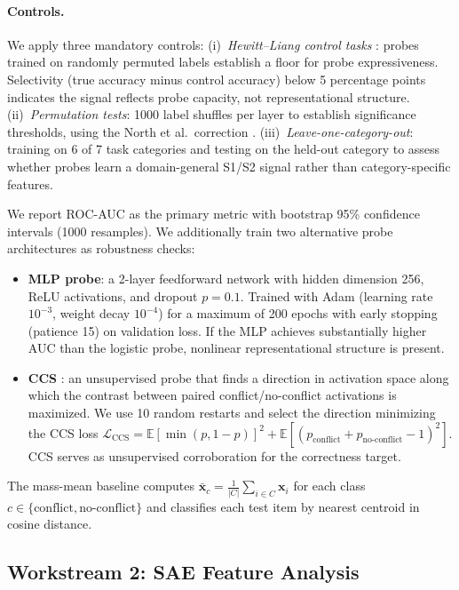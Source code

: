 \paragraph{Controls.}  We apply three mandatory controls:
(i)~\emph{Hewitt--Liang control tasks} \citep{hewitt2019control}: probes
trained on randomly permuted labels establish a floor for probe
expressiveness.  Selectivity (true accuracy minus control accuracy) below
5 percentage points indicates the signal reflects probe capacity, not
representational structure.
(ii)~\emph{Permutation tests}: 1000 label shuffles per layer to establish
significance thresholds, using the North et al.\ correction
\citep{north2002note}.
(iii)~\emph{Leave-one-category-out}: training on 6 of 7 task categories and
testing on the held-out category to assess whether probes learn a
domain-general S1/S2 signal rather than category-specific features.

We report ROC-AUC as the primary metric with bootstrap 95\% confidence
intervals (1000 resamples).  We additionally train two alternative probe
architectures as robustness checks:

\begin{itemize}[leftmargin=*,itemsep=1pt]
  \item \textbf{MLP probe}: a 2-layer feedforward network with hidden
  dimension 256, ReLU activations, and dropout $p = 0.1$.  Trained with
  Adam (learning rate $10^{-3}$, weight decay $10^{-4}$) for a maximum of
  200 epochs with early stopping (patience 15) on validation loss.  If the
  MLP achieves substantially higher AUC than the logistic probe, nonlinear
  representational structure is present.
  \item \textbf{CCS} \citep{burns2022discovering}: an unsupervised probe
  that finds a direction in activation space along which the contrast
  between paired conflict/no-conflict activations is maximized.  We use 10
  random restarts and select the direction minimizing the CCS loss
  $\mathcal{L}_{\text{CCS}} = \mathbb{E}[\min(p, 1 - p)]^2 +
  \mathbb{E}[(p_{\text{conflict}} + p_{\text{no-conflict}} - 1)^2]$.
  CCS serves as unsupervised corroboration for the correctness target.
\end{itemize}

\noindent
The mass-mean baseline computes
$\bar{\mathbf{x}}_c = \frac{1}{|C|}\sum_{i \in C} \mathbf{x}_i$ for each
class $c \in \{\text{conflict}, \text{no-conflict}\}$ and classifies each
test item by nearest centroid in cosine distance.

\subsection{Workstream 2: SAE Feature Analysis}
\label{sec:sae}

